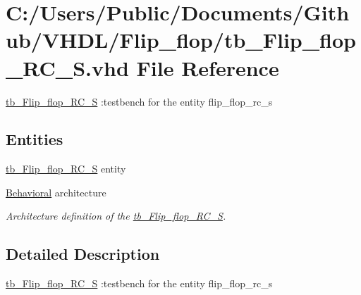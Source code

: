 \hypertarget{tb___flip__flop___r_c___s_8vhd}{}\section{C\+:/\+Users/\+Public/\+Documents/\+Github/\+V\+H\+D\+L/\+Flip\+\_\+flop/tb\+\_\+\+Flip\+\_\+flop\+\_\+\+R\+C\+\_\+S.vhd File Reference}
\label{tb___flip__flop___r_c___s_8vhd}


\hyperlink{classtb___flip__flop___r_c___s}{tb\+\_\+\+Flip\+\_\+flop\+\_\+\+R\+C\+\_\+S} \+:testbench for the entity flip\+\_\+flop\+\_\+rc\+\_\+s  


\subsection*{Entities}
\begin{DoxyCompactItemize}
\item 
\hyperlink{classtb___flip__flop___r_c___s}{tb\+\_\+\+Flip\+\_\+flop\+\_\+\+R\+C\+\_\+S} entity
\item 
\hyperlink{classtb___flip__flop___r_c___s_1_1_behavioral}{Behavioral} architecture
\begin{DoxyCompactList}\small\item\em Architecture definition of the \hyperlink{classtb___flip__flop___r_c___s}{tb\+\_\+\+Flip\+\_\+flop\+\_\+\+R\+C\+\_\+S}. \end{DoxyCompactList}\end{DoxyCompactItemize}


\subsection{Detailed Description}
\hyperlink{classtb___flip__flop___r_c___s}{tb\+\_\+\+Flip\+\_\+flop\+\_\+\+R\+C\+\_\+S} \+:testbench for the entity flip\+\_\+flop\+\_\+rc\+\_\+s 

